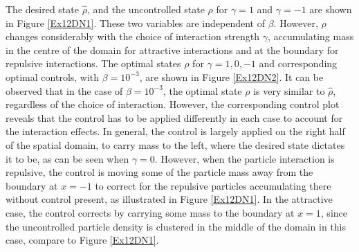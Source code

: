  The desired state $\widehat \rho$, and the uncontrolled state $\rho$ for $\gamma =1$ and $\gamma = -1$ are shown in Figure \ref{Ex12DN1}. These two variables are independent of $\beta$. However, $\rho$ changes considerably with the choice of interaction strength $\gamma$, accumulating mass in the centre of the domain for attractive interactions and at the boundary for repulsive interactions. The optimal states $\rho$ for $\gamma = 1,0,-1$ and corresponding optimal controls, with $\beta = 10^{-3}$, are shown in Figure \ref{Ex12DN2}. 
It can be observed that in the case of $\beta = 10^{-3}$, the optimal state $\rho$ is very similar to $\hat \rho$, regardless of the choice of interaction. However, the corresponding control plot reveals that the control has to be applied differently in each case to account for the interaction effects. In general, the control is largely applied on the right half of the spatial domain, to carry mass to the left, where the desired state dictates it to be, as can be seen when $\gamma = 0$. However, when the particle interaction is repulsive, the control is moving some of the particle mass away from the boundary at $x=-1$ to correct for the repulsive particles accumulating there without control present, as illustrated in Figure \ref{Ex12DN1}. In the attractive case, the control corrects by carrying some mass to the boundary at $x=1$, since the uncontrolled particle density is clustered in the middle of the domain in this case, compare to Figure \ref{Ex12DN1}.
%
